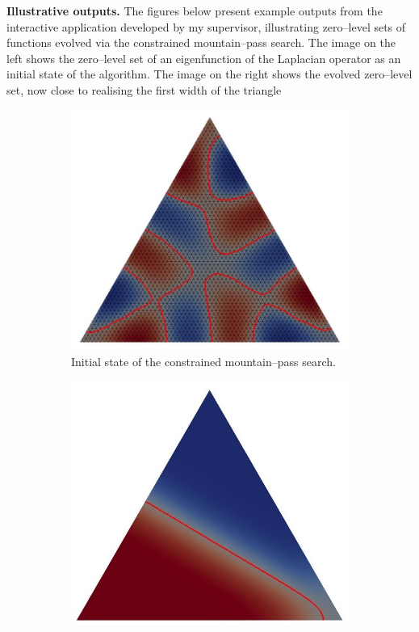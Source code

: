 \noindent\textbf{Illustrative outputs.}
The figures below present example outputs from the interactive application developed by my supervisor, illustrating zero--level sets of functions evolved via the constrained mountain--pass search. 
The image on the left shows the zero--level set of an eigenfunction of the Laplacian operator as an initial state of the algorithm. 
The image on the right shows the evolved zero--level set, now close to realising the first width of the triangle

\begin{figure}[ht]
  \centering
  \begin{subfigure}{0.49\textwidth}
    \centering
    \includegraphics[width=\linewidth]{figures/width2.JPG}
    \caption{Initial state of the constrained mountain--pass search.}
  \end{subfigure}\hfill
  \begin{subfigure}{0.47\textwidth}
    \centering
    \includegraphics[width=\linewidth]{figures/width1.JPG}

\end{subfigure}
\end{figure}
